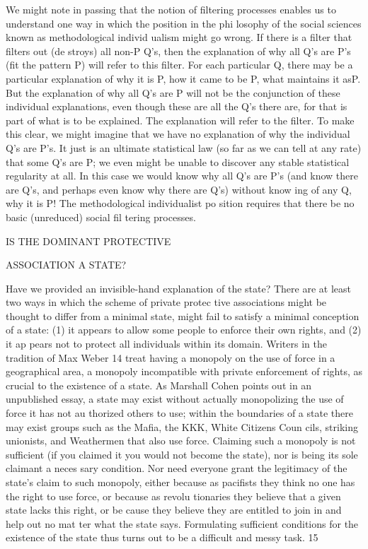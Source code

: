 \documentclass[11pt,openany]{book}
\begin{document}
We might note in passing that the notion of filtering processes enables us to understand one way in which the position in the phi losophy of the social sciences known as methodological individ ualism might go wrong. If there is a filter that filters out (de stroys) all non-P Q's, then the explanation of why all Q's are P's (fit the pattern P) will refer to this filter. For each particular Q, there may be a particular explanation of why it is P, how it came to be P, what maintains it asP. But the explanation of why all Q's are P will not be the conjunction of these individual explanations, even though these are all the Q's there are, for that is part of what is to be explained. The explanation will refer to the filter. To make this clear, we might imagine that we have no explanation of why the individual Q's are P's. It just is an ultimate statistical law (so far as we can tell at any rate) that some Q's are P; we even might be unable to discover any stable statistical regularity at all. In this case we would know why all Q's are P's (and know there are Q's, and perhaps even know why there are Q's) without know ing of any Q, why it is P! The methodological individualist po sition requires that there be no basic (unreduced) social fil tering processes. 

IS THE DOMINANT PROTECTIVE 

ASSOCIATION A STATE? 

Have we provided an invisible-hand explanation of the state? There are at least two ways in which the scheme of private protec tive associations might be thought to differ from a minimal state, might fail to satisfy a minimal conception of a state: (1) it appears to allow some people to enforce their own rights, and (2) it ap pears not to protect all individuals within its domain. Writers in the tradition of Max Weber 14 treat having a monopoly on the use of force in a geographical area, a monopoly incompatible with private enforcement of rights, as crucial to the existence of a state. As Marshall Cohen points out in an unpublished essay, a state may exist without actually monopolizing the use of force it has not au thorized others to use; within the boundaries of a state there may exist groups such as the Mafia, the KKK, White Citizens Coun cils, striking unionists, and Weathermen that also use force. Claiming such a monopoly is not sufficient (if you claimed it you would not become the state), nor is being its sole claimant a neces sary condition. Nor need everyone grant the legitimacy of the state's claim to such monopoly, either because as pacifists they think no one has the right to use force, or because as revolu tionaries they believe that a given state lacks this right, or be cause they believe they are entitled to join in and help out no mat ter what the state says. Formulating sufficient conditions for the existence of the state thus turns out to be a difficult and messy task. 15 
\end{document}
